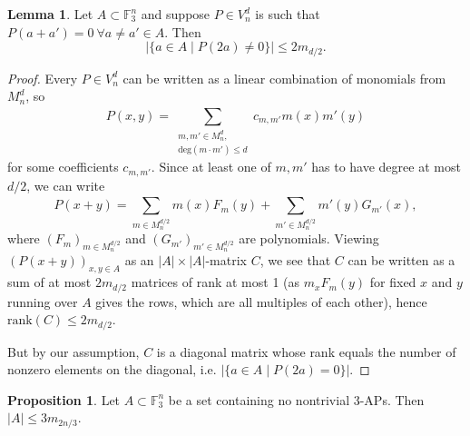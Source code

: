 \documentclass{article}
\theoremstyle{definition}
\newtheorem{lemma}[theorem]{Lemma}
\newtheorem{prop}[theorem]{Proposition}
\begin{document}
\begin{lemma}\label{lemma4.2}
    Let $A \subset \mathbb{F}_3^n$ and suppose $P \in V_n^d$ is such that $P(a+a') = 0 ~\forall a \neq a' \in A$. Then \[
    \left|\{a \in A \mid P(2a) \neq 0\}\right| \le 2 m_{d/2}.
    \]
\end{lemma}
\begin{proof}
    Every $P \in V_n^d$ can be written as a linear combination of monomials from $M_n^d$, so $$P(x,y) = \sum_{\substack{m,m' \in M_n^d, \\ \text{deg}(m\cdot m')\le d}}^{} c_{m,m'}m(x)m'(y)$$
    for some coefficients $c_{m,m'}$. Since at least one of $m,m'$ has to have degree at most $d/2$, we can write \[
    P(x+y) = \sum_{m \in M_n^{d/2}}^{} m(x)F_m(y) + \sum_{m' \in M_n^{d/2}}^{} m'(y) G_{m'}(x),
    \]
    where $(F_m)_{m \in M_n^{d/2}}$ and $(G_{m'})_{m' \in M_n^{d/2}}$ are polynomials. Viewing $(P(x+y))_{x,y \in A}$ as an $\left|A\right|\times\left|A\right|$-matrix $C$, we see that $C$ can be written as a sum of at most $2m_{d/2}$ matrices of rank at most 1 (as $m_x F_m(y)$ for fixed $x$ and $y$ running over $A$ gives the rows, which are all multiples of each other), hence $\text{rank}(C) \le 2m_{d/2}$.
    \vspace{1mm}
        
    But by our assumption, $C$ is a diagonal matrix whose rank equals the number of nonzero elements on the diagonal, i.e. $\left|\{a \in A \mid P(2a)=0\}\right|$.
\end{proof}
\begin{prop}\label{prop4.3}
    Let $A \subset \mathbb{F}_3^n$ be a set containing no nontrivial 3-APs. Then $\left|A\right|\le 3m_{2n/3}$.
\end{prop}
\end{document}

